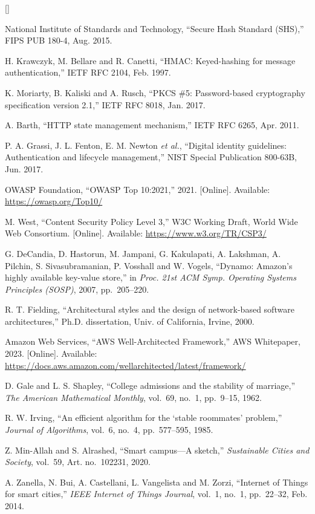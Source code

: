\documentclass[12pt,a4paper,oneside]{report}
\begin{document}
\begin{list}{[]}{\setlength{\labelwidth}{2.2em}\setlength{\leftmargin}{2.8em}%
  \setlength{\labelsep}{0.6em}\setlength{\itemsep}{4pt}\setlength{\parsep}{0pt}}
\item National Institute of Standards and Technology, ``Secure Hash Standard (SHS),'' FIPS PUB 180-4, Aug. 2015.
\item H. Krawczyk, M. Bellare and R. Canetti, ``HMAC: Keyed-hashing for message authentication,'' IETF RFC 2104, Feb. 1997.
\item K. Moriarty, B. Kaliski and A. Rusch, ``PKCS \#5: Password-based cryptography specification version 2.1,'' IETF RFC 8018, Jan. 2017.
\item A. Barth, ``HTTP state management mechanism,'' IETF RFC 6265, Apr. 2011.
\item P. A. Grassi, J. L. Fenton, E. M. Newton \emph{et al.}, ``Digital identity guidelines: Authentication and lifecycle management,'' NIST Special Publication 800-63B, Jun. 2017.
\item OWASP Foundation, ``OWASP Top 10:2021,'' 2021. [Online]. Available: \url{https://owasp.org/Top10/}
\item M. West, ``Content Security Policy Level 3,'' W3C Working Draft, World Wide Web Consortium. [Online]. Available: \url{https://www.w3.org/TR/CSP3/}
\item G. DeCandia, D. Hastorun, M. Jampani, G. Kakulapati, A. Lakshman, A. Pilchin, S. Sivasubramanian, P. Vosshall and W. Vogels, ``Dynamo: Amazon's highly available key-value store,'' in \emph{Proc. 21st ACM Symp. Operating Systems Principles (SOSP)}, 2007, pp.~205--220.
\item R. T. Fielding, ``Architectural styles and the design of network-based software architectures,'' Ph.D. dissertation, Univ. of California, Irvine, 2000.
\item Amazon Web Services, ``AWS Well-Architected Framework,'' AWS Whitepaper, 2023. [Online]. Available: \url{https://docs.aws.amazon.com/wellarchitected/latest/framework/}
\item D. Gale and L. S. Shapley, ``College admissions and the stability of marriage,'' \emph{The American Mathematical Monthly}, vol.~69, no.~1, pp.~9--15, 1962.
\item R. W. Irving, ``An efficient algorithm for the `stable roommates' problem,'' \emph{Journal of Algorithms}, vol.~6, no.~4, pp.~577--595, 1985.
\item Z. Min-Allah and S. Alrashed, ``Smart campus---A sketch,'' \emph{Sustainable Cities and Society}, vol.~59, Art. no.~102231, 2020.
\item A. Zanella, N. Bui, A. Castellani, L. Vangelista and M. Zorzi, ``Internet of Things for smart cities,'' \emph{IEEE Internet of Things Journal}, vol.~1, no.~1, pp.~22--32, Feb. 2014.

\end{list}
\end{document}
